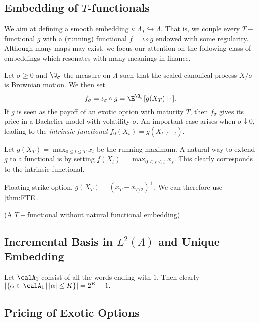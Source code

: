 \subsection{Embedding of $T$-functionals}
We aim at defining a smooth embedding $\iota: \Lambda_T \hookrightarrow \Lambda$. That is, we couple every $T-$functional $g$ with a (running) functional $f=\iota \circ  g$ endowed with some regularity. Although many maps may exist, we focus our attention on the following class of embeddings which resonates with many meanings in finance. 

Let $\sigma \ge 0$ and $\Q_\sigma$ the measure on $\Lambda$ such that the scaled canonical process $X/ \sigma$ is %
Brownian motion. We then set 
$$f_{\sigma}= \iota_\sigma \circ  g = \E^{\Q_{\sigma}}[g(X_T) \,|\, \cdot\, ].$$ If $g$ is seen as the payoff of an exotic option with maturity $T$, then $f_{\sigma}$ gives its price in a Bachelier model with volatility $\sigma$.
An important case arises when $\sigma \downarrow 0$, leading to the \textit{intrinsic functional} $f_0(X_t) = g(X_{t,T-t})$. %

\begin{example}
Let $g(X_T)= \max_{0 \le t \le T}x_t$ be the running maximum. A natural way to extend $g$ to a functional is by setting $f(X_t)= \max_{0 \le s \le t}x_s$. This clearly corresponds to the intrinsic functional. 
\end{example}

\begin{example}
Floating strike option. $g(X_T) = (x_T - x_{T/2})^{+}$. We can therefore use \cref{thm:FTE}. 
\end{example}

\begin{example}(A $T-$functional without natural functional embedding)
\end{example}

\subsection{Incremental Basis in $L^2(\Lambda)$ and Unique Embedding}


Let $\calA_1$ consist of all the words ending with $1$. Then clearly $|\{\alpha \in \calA_1 \,|\, |\alpha|\le K \}| = 2^K-1.$ 

\subsection{Pricing of Exotic Options}

